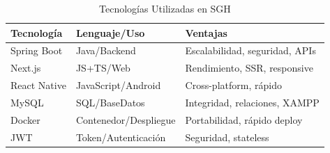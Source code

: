 \begin{table}[h]
\centering
\caption{Tecnologías Utilizadas en SGH}
\label{tab:frameworks}
\renewcommand{\arraystretch}{1.3}
\footnotesize
\begin{tabular}{|l|p{2.5cm}|p{3cm}|}
\hline
\textbf{Tecnología} & \textbf{Lenguaje/Uso} & \textbf{Ventajas} \\
\hline
Spring Boot & Java/Backend & Escalabilidad, seguridad, APIs \\
\hline
Next.js & JS+TS/Web & Rendimiento, SSR, responsive \\
\hline
React Native & JavaScript/Android & Cross-platform, rápido \\
\hline
MySQL & SQL/BaseDatos & Integridad, relaciones, XAMPP \\
\hline
Docker & Contenedor/Despliegue & Portabilidad, rápido deploy \\
\hline
JWT & Token/Autenticación & Seguridad, stateless \\
\hline
\end{tabular}
\end{table}